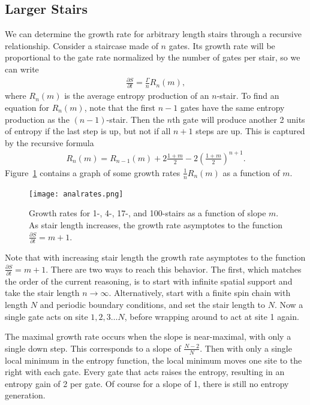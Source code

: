 \documentclass[11pt]{article}
\newcommand{\pd}[2]{\frac{\partial #1}{\partial #2}}
\renewcommand{\th}[1]{\frac{1}{#1}}
\begin{document}
\subsection{Larger Stairs} \emph{} \label{sub:largestairs}

We can determine the growth rate for arbitrary length stairs through a recursive relationship. Consider a staircase made of $n$ gates. Its growth rate will be proportional to the gate rate normalized by the number of gates per stair, so we can write
\begin{align}
\pd{S}{t} = \frac{\Gamma}{n}R_n(m), \label{eqn:growthrate}
\end{align}
where $R_n(m)$ is the average entropy production of an $n$-stair. To find an equation for $R_n(m)$, note that the first $n-1$ gates have the same entropy production as the $(n-1)$-stair. Then the $n$th gate will produce another 2 units of entropy if the last step is up, but not if all $n+1$ steps are up. This is captured by the recursive formula
\begin{align}
R_n(m) = R_{n-1}(m)+2\frac{1+m}{2} - 2\left(\frac{1+m}{2}\right)^{n+1}. \label{eqn:raterecur}
\end{align}
Figure~\ref{fig:growthrates} contains a graph of some growth rates $\th{n}R_n(m)$ as a function of $m$.

\begin{figure}
	\centering
	\texttt{[image: analrates.png]}
	\caption{Growth rates for 1-, 4-, 17-, and 100-stairs as a function of slope $m$. As stair length increases, the growth rate asymptotes to the function $\pd{S}{t} = m+1$.}
	\label{fig:growthrates}
\end{figure}

Note that with increasing stair length the growth rate asymptotes to the function $\pd{S}{t} = m+1$. There are two ways to reach this behavior. The first, which matches the order of the current reasoning, is to start with infinite spatial support and take the stair length $n\to\infty$. Alternatively, start with a finite spin chain with length $N$ and periodic boundary conditions, and set the stair length to $N$. Now a single gate acts on site $1,2,3\dots N$, before wrapping around to act at site 1 again. 

The maximal growth rate occurs when the slope is near-maximal, with only a single down step. This corresponds to a slope of $\frac{N-2}{N}$. Then with only a single local minimum in the entropy function, the local minimum moves one site to the right with each gate. Every gate that acts raises the entropy, resulting in an entropy gain of 2 per gate. Of course for a slope of 1, there is still no entropy generation.
\end{document}
